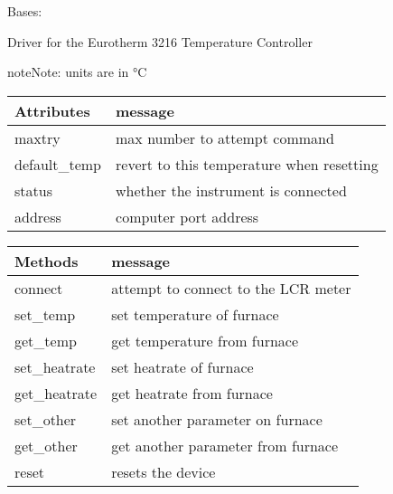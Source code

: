 \documentclass[letterpaper,10pt,english]{sphinxmanual}
\begin{document}
\begin{fulllineitems}
\label{\detokenize{source/laboratory.drivers:laboratory.drivers.furnace.Furnace}}
Bases: 

Driver for the Eurotherm 3216 Temperature Controller

\begin{sphinxadmonition}{note}{Note:}
units are in °C
\end{sphinxadmonition}


\begin{savenotes}\sphinxattablestart
\centering
\begin{tabulary}{\linewidth}[t]{|T|T|}
\hline
\sphinxstyletheadfamily 
Attributes
&\sphinxstyletheadfamily 
message
\\
\hline
maxtry
&
max number to attempt command
\\
\hline
default\_temp
&
revert to this temperature when resetting
\\
\hline
status
&
whether the instrument is connected
\\
\hline
address
&
computer port address
\\
\hline
\end{tabulary}
\par
\sphinxattableend\end{savenotes}


\begin{savenotes}\sphinxattablestart
\centering
\begin{tabulary}{\linewidth}[t]{|T|T|}
\hline
\sphinxstyletheadfamily 
Methods
&\sphinxstyletheadfamily 
message
\\
\hline
connect
&
attempt to connect to the LCR meter
\\
\hline
set\_temp
&
set temperature of furnace
\\
\hline
get\_temp
&
get temperature from furnace
\\
\hline
set\_heatrate
&
set heatrate of furnace
\\
\hline
get\_heatrate
&
get heatrate from furnace
\\
\hline
set\_other
&
set another parameter on furnace
\\
\hline
get\_other
&
get another parameter from furnace
\\
\hline
reset
&
resets the device
\\
\hline
\end{tabulary}
\par
\sphinxattableend\end{savenotes}


\end{fulllineitems}
\end{document}

